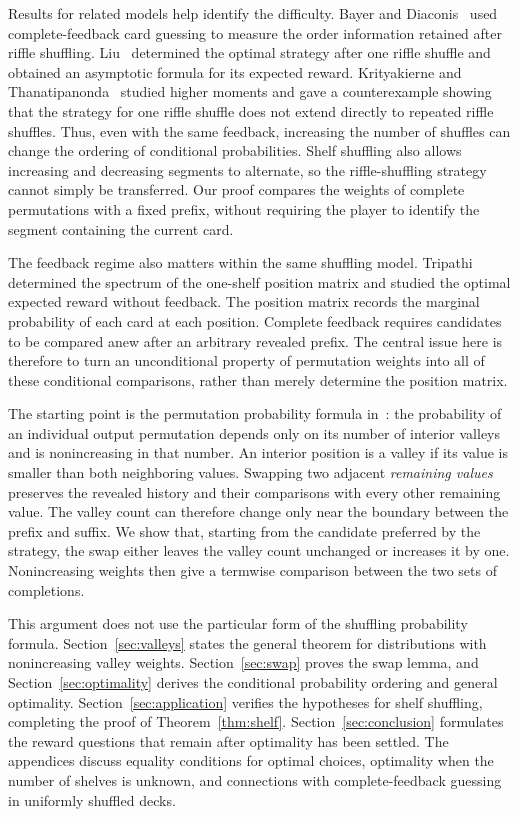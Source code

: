 \documentclass[11pt,reqno]{amsart}
\numberwithin{equation}{section}
\theoremstyle{definition}
\theoremstyle{remark}
\begin{document}
Results for related models help identify the difficulty. Bayer and Diaconis~\cite[Section 5.1]{BD} used complete-feedback card guessing to measure the order information retained after riffle shuffling. Liu~\cite{Liu} determined the optimal strategy after one riffle shuffle and obtained an asymptotic formula for its expected reward. Krityakierne and Thanatipanonda~\cite{KT} studied higher moments and gave a counterexample showing that the strategy for one riffle shuffle does not extend directly to repeated riffle shuffles. Thus, even with the same feedback, increasing the number of shuffles can change the ordering of conditional probabilities. Shelf shuffling also allows increasing and decreasing segments to alternate, so the riffle-shuffling strategy cannot simply be transferred. Our proof compares the weights of complete permutations with a fixed prefix, without requiring the player to identify the segment containing the current card.

The feedback regime also matters within the same shuffling model. Tripathi~\cite{TripathiPosition} determined the spectrum of the one-shelf position matrix and studied the optimal expected reward without feedback. The position matrix records the marginal probability of each card at each position. Complete feedback requires candidates to be compared anew after an arbitrary revealed prefix. The central issue here is therefore to turn an unconditional property of permutation weights into all of these conditional comparisons, rather than merely determine the position matrix.

The starting point is the permutation probability formula in~\cite[Theorem 3.1 and Corollary 3.3]{DFH}: the probability of an individual output permutation depends only on its number of interior valleys and is nonincreasing in that number. An interior position is a valley if its value is smaller than both neighboring values. Swapping two adjacent \emph{remaining values} preserves the revealed history and their comparisons with every other remaining value. The valley count can therefore change only near the boundary between the prefix and suffix. We show that, starting from the candidate preferred by the strategy, the swap either leaves the valley count unchanged or increases it by one. Nonincreasing weights then give a termwise comparison between the two sets of completions.

This argument does not use the particular form of the shuffling probability formula. Section~\ref{sec:valleys} states the general theorem for distributions with nonincreasing valley weights. Section~\ref{sec:swap} proves the swap lemma, and Section~\ref{sec:optimality} derives the conditional probability ordering and general optimality. Section~\ref{sec:application} verifies the hypotheses for shelf shuffling, completing the proof of Theorem~\ref{thm:shelf}. Section~\ref{sec:conclusion} formulates the reward questions that remain after optimality has been settled. The appendices discuss equality conditions for optimal choices, optimality when the number of shelves is unknown, and connections with complete-feedback guessing in uniformly shuffled decks.
\end{document}
